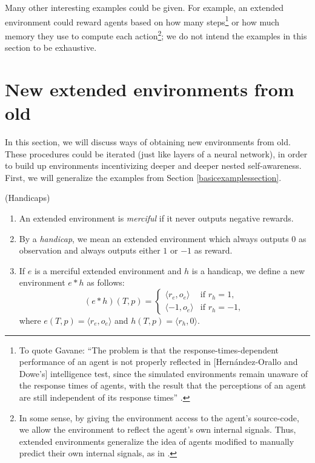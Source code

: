 \documentclass[runningheads]{llncs}
\begin{document}
Many other interesting examples could be given. For example, an extended environment
could reward agents based on how many steps\footnote{To quote
Gavane:
``The problem is that the response-times-dependent performance of an agent
is not properly reflected in [Hern{\'a}ndez-Orallo and Dowe's] intelligence test,
since the simulated environments remain unaware of the response times of agents,
with the result that the perceptions of an agent are still independent of its
response times'' \cite{gavane}.} or how much memory
they use to compute each action\footnote{In some sense, by giving the environment
access to the agent's source-code, we allow the environment to reflect the agent's
own internal signals. Thus, extended environments generalize the idea of
agents modified to manually predict their own internal signals, as in
\cite{sherstan2016introspective}.};
we do not intend the examples in this section to be exhaustive.

\section{New extended environments from old}
\label{newextendedenvironmentsfromoldsecn}

In this section, we will discuss ways of obtaining new environments from old.
These procedures could be iterated (just like layers of a neural network),
in order to build up environments incentivizing deeper and deeper nested self-awareness.
First, we will generalize the examples from Section \ref{basicexamplessection}.

\begin{definition}
    (Handicaps)
    \begin{enumerate}
        \item
        An extended environment is \emph{merciful} if it never outputs negative rewards.
        \item
        By a \emph{handicap}, we mean an extended environment which always outputs $0$ as
        observation and always outputs either $1$ or $-1$ as reward.
        \item
        If $e$ is a merciful extended environment and $h$ is a handicap,
        we define a new environment $e*h$ as follows:
        \[
            (e*h)(T,p) =
            \begin{cases}
                \langle r_e, o_e\rangle &\mbox{if $r_h=1$},\\
                \langle -1, o_e\rangle &\mbox{if $r_h=-1$},
            \end{cases}
        \]
        where $e(T,p)=\langle r_e,o_e\rangle$ and $h(T,p)=\langle r_h,0\rangle$.
    \end{enumerate}
\end{definition}
\end{document}
